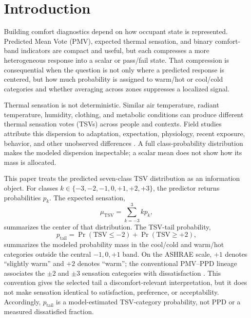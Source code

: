 \section{Introduction}\label{intro}

Building comfort diagnostics depend on how occupant state is represented. Predicted Mean Vote (PMV), expected thermal sensation, and binary comfort-band indicators are compact and useful, but each compresses a more heterogeneous response into a scalar or pass/fail state. That compression is consequential when the question is not only where a predicted response is centered, but how much probability is assigned to warm/hot or cool/cold categories and whether averaging across zones suppresses a localized signal.

Thermal sensation is not deterministic. Similar air temperature, radiant temperature, humidity, clothing, and metabolic conditions can produce different thermal sensation votes (TSVs) across people and contexts. Field studies attribute this dispersion to adaptation, expectation, physiology, recent exposure, behavior, and other unobserved differences \citep{deDear1998Adaptive,Brager2000Adaptive,Humphreys2002Adaptive,Foldvary2018GlobalDB}. A full class-probability distribution makes the modeled dispersion inspectable; a scalar mean does not show how its mass is allocated.

This paper treats the predicted seven-class TSV distribution as an information object. For classes $k\in\{-3,-2,-1,0,+1,+2,+3\}$, the predictor returns probabilities $p_k$. The expected sensation,
\begin{equation}
\mu_{\mathrm{TSV}}=\sum_{k=-3}^{3} k p_k,
\end{equation}
summarizes the center of that distribution. The TSV-tail probability,
\begin{equation}
p_{\mathrm{tail}}=\Pr(\mathrm{TSV}\le -2)+\Pr(\mathrm{TSV}\ge +2),
\end{equation}
summarizes the modeled probability mass in the cool/cold and warm/hot categories outside the central $-1,0,+1$ band. On the ASHRAE scale, $+1$ denotes ``slightly warm'' and $+2$ denotes ``warm''; the conventional PMV--PPD lineage associates the $\pm2$ and $\pm3$ sensation categories with dissatisfaction \citep{Fanger1970PMV,ASHRAE2023}. This convention gives the selected tail a discomfort-relevant interpretation, but it does not make sensation identical to satisfaction, preference, or acceptability. Accordingly, $p_{\mathrm{tail}}$ is a model-estimated TSV-category probability, not PPD or a measured dissatisfied fraction.

